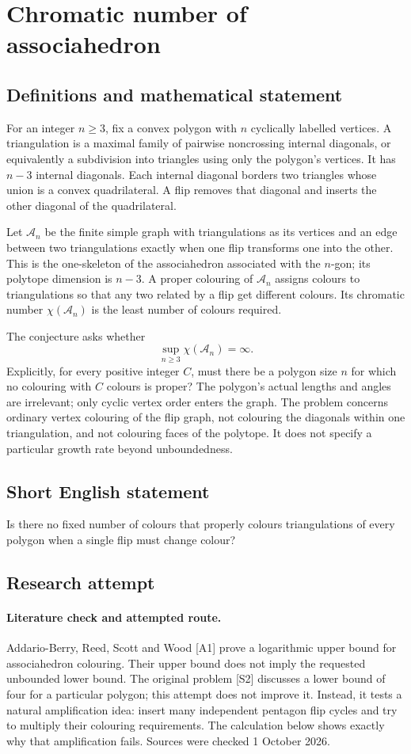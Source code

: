 \documentclass[11pt,a4paper]{article}
\begin{document}
\section*{Chromatic number of associahedron}\label{statement}

\subsection{Definitions and mathematical statement}
For an integer $n\ge3$, fix a convex polygon with $n$ cyclically labelled
vertices. A triangulation is a maximal family of pairwise noncrossing
internal diagonals, or equivalently a subdivision into triangles using
only the polygon's vertices. It has $n-3$ internal diagonals.
Each internal diagonal borders two triangles whose union is a convex
quadrilateral. A flip removes that diagonal and inserts the other diagonal
of the quadrilateral.

Let $\mathcal A_n$ be the finite simple graph with triangulations as its
vertices and an edge between two triangulations exactly when one flip
transforms one into the other. This is the one-skeleton of the associahedron
associated with the $n$-gon; its polytope dimension is $n-3$.
A proper colouring of $\mathcal A_n$ assigns colours to triangulations
so that any two related by a flip get different colours. Its chromatic
number $\chi(\mathcal A_n)$ is the least number of colours required.

The conjecture asks whether
\[
 \sup_{n\ge3}\chi(\mathcal A_n)=\infty.
\]
Explicitly, for every positive integer $C$, must there be a polygon size
$n$ for which no colouring with $C$ colours is proper? The polygon's
actual lengths and angles are irrelevant; only cyclic vertex order
enters the graph. The problem concerns ordinary vertex colouring of the
flip graph, not colouring the diagonals within one triangulation, and
not colouring faces of the polytope. It does not specify a particular
growth rate beyond unboundedness.
\subsection{Short English statement}
Is there no fixed number of colours that properly colours triangulations of every polygon when a single flip must change colour?
\subsection{Research attempt}
\paragraph{Literature check and attempted route.}
Addario-Berry, Reed, Scott and Wood [A1] prove a logarithmic upper bound for
associahedron colouring. Their upper bound does not imply the requested
unbounded lower bound. The original problem [S2] discusses a lower bound of
four for a particular polygon; this attempt does not improve it. Instead,
it tests a natural amplification idea: insert many independent pentagon flip
cycles and try to multiply their colouring requirements. The calculation below
shows exactly why that amplification fails. Sources were checked 1 October 2026.
\end{document}

